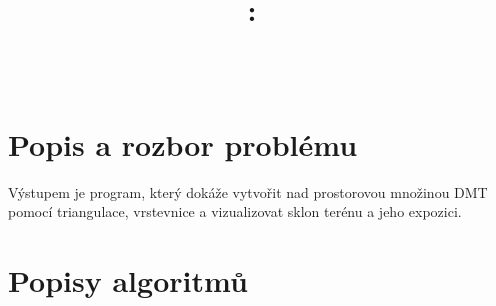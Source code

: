 \documentclass{article}
\title{
\vspace{2in}
\textmd{\textbf{\hmwkClass:\ \hmwkTitle}}\\
\normalsize\vspace{0.1in}\large{\hmwkDueDate}\\
\vspace{3in}
}
\author{\textbf{\hmwkAuthorName}}
\date{} %
\begin{document}
\maketitle



\newpage
\tableofcontents
\newpage




\section{Popis a rozbor problému} %
\indent Výstupem je program, který dokáže vytvořit nad prostorovou množinou DMT pomocí triangulace, vrstevnice a vizualizovat sklon terénu a jeho expozici. 

\clearpage
\section{Popisy algoritmů} %
\end{document}
